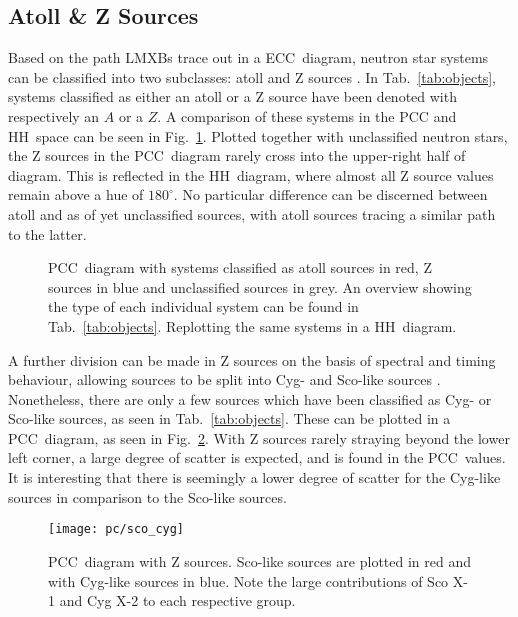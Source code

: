 \subsection{Atoll \& Z Sources}
Based on the path \acp{LMXB} trace out in a \ac{ECC}~diagram, neutron star systems can be classified into two subclasses: atoll and Z sources \citep{hasinger1989two}. In Tab.~\ref{tab:objects}, systems classified as either an atoll or a Z source have been denoted with respectively an $A$ or a $Z$. A comparison of these systems in the \ac{PCC} and \ac{HH}~space can be seen in Fig.~\ref{fig:atoll_z}. Plotted together with unclassified neutron stars, the Z sources in the \ac{PCC}~diagram rarely cross into the upper-right half of diagram. This is reflected in the \ac{HH}~diagram, where almost all Z source values remain above a hue of $180^\circ$. No particular difference can be discerned between atoll and as of yet unclassified sources, with atoll sources tracing a similar path to the latter.\\

\begin{figure}[p]
\myfloatalign%
%
\caption[Comparing Atoll and Z sources]{ \ac{PCC}~diagram with systems classified as atoll sources in red, Z sources in blue and unclassified sources in grey. An overview showing the type of each individual system can be found in Tab.~\ref{tab:objects}.  Replotting the same systems in a \ac{HH}~diagram.}\label{fig:atoll_z} %
\end{figure}

A further division can be made in Z sources on the basis of spectral and timing behaviour, allowing sources to be split into Cyg- and Sco-like sources \citep{kuulkers1997gx}. Nonetheless, there are only a few sources which have been classified as Cyg- or Sco-like sources, as seen in Tab.~\ref{tab:objects}. These can be plotted in a \ac{PCC}~diagram, as seen in Fig.~\ref{fig:pc_sco_cyg}. With Z sources rarely straying beyond the lower left corner, a large degree of scatter is expected, and is found in the \ac{PCC}~values. It is interesting that there is seemingly a lower degree of scatter for the Cyg-like sources in comparison to the Sco-like sources.\\

\begin{figure}[p]
	\myfloatalign
	{\texttt{[image: pc/sco\_cyg]}}
	\caption[\acs{PCC}~diagram with Sco- and Cyg-like sources]{\ac{PCC}~diagram with Z sources. Sco-like sources are plotted in red and with Cyg-like sources in blue. Note the large contributions of Sco X-1 and Cyg X-2 to each respective group.}\label{fig:pc_sco_cyg}
\end{figure}

